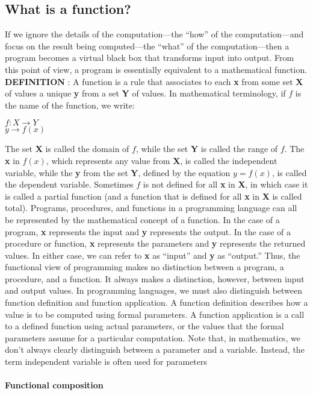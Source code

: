 \documentclass[11pt]{article}
\begin{document}
\subsection{What is a function?}

If we ignore the details of the computation—the “how” of the computation—and focus on the result being computed—the “what” of the computation—then a program becomes a virtual black box that transforms input into output. From this point of view, a program is essentially equivalent to a mathematical function.\\
\textbf{DEFINITION} : A function is a rule that associates to each \textbf{x} from some set \textbf{X} of values a unique \textbf{y}
from a set \textbf{Y} of values. In mathematical terminology, if $f$ is the name of the function, we write:
\begin{center}
  $  f: X\rightarrow Y$\\
  $y\rightarrow f(x)$
\end{center}
The set \textbf{X} is called the domain of $f$, while the set \textbf{Y} is called the range of $f$. The \textbf{x} in $f(x)$, which represents any value from \textbf{X}, is called the independent variable, while the \textbf{y} from the set \textbf{Y}, defined by the
equation $y = f(x)$, is called the dependent variable. Sometimes $f$ is not defined for all \textbf{x} in \textbf{X}, in which
case it is called a partial function (and a function that is defined for all \textbf{x} in \textbf{X} is called total).
Programs, procedures, and functions in a programming language can all be represented by the
mathematical concept of a function. In the case of a program, \textbf{x} represents the input and \textbf{y} represents the
output. In the case of a procedure or function, \textbf{x} represents the parameters and \textbf{y} represents the returned
values. In either case, we can refer to \textbf{x} as “input” and \textbf{y} as “output.” Thus, the functional view of programming makes no distinction between a program, a procedure, and a function. It always makes a
distinction, however, between input and output values.
In programming languages, we must also distinguish between function definition and
function application. A function definition describes how a value is to be computed using formal parameters. A function application is a call to a defined function using actual parameters, or the values
that the formal parameters assume for a particular computation. Note that, in mathematics, we don’t
always clearly distinguish between a parameter and a variable. Instead, the term independent variable is
often used for parameters
\\
\\
\textbf{Functional composition}
\end{document}
